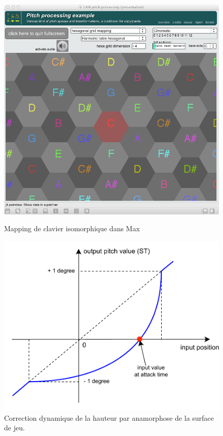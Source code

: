 \begin{figure}[!htbp]
	\captionsetup{format=plain}%
	\centering
	\begin{minipage}[t]{0.48\textwidth}
	 	\includegraphics[width=\linewidth]{gfx/04_algorithms/MID-HarmonicHexa-mapping.png}
		\caption[Clavier isomorphique dans Max]{Mapping de clavier isomorphique dans Max}
		\label{fig:algorithms:MID-hexakeyboard}
	\end{minipage}
	\hspace{.02\linewidth}
	\begin{minipage}[t]{0.48\textwidth}
	  \includegraphics[width=\linewidth]{gfx/04_algorithms/MID-dynamic-pitch-correction.pdf}
		\caption[Correction dynamique de la hauteur]{Correction dynamique de la hauteur par anamorphose de la surface de jeu.}
		\label{fig:algorithms:MID-dynamic-pitch-correction}
	\end{minipage}
\end{figure}

